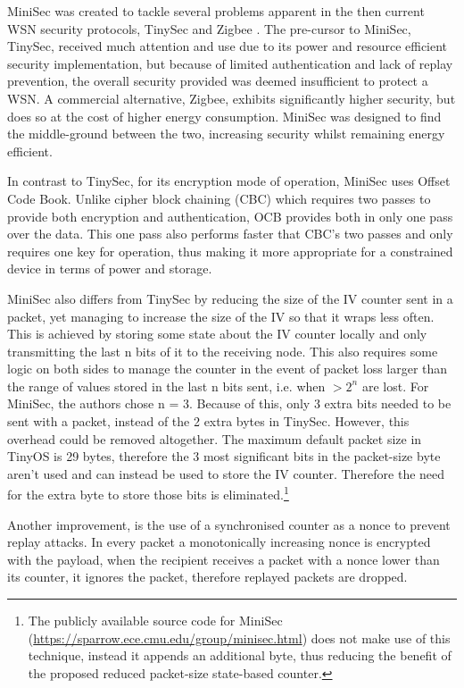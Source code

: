 MiniSec was created to tackle several problems apparent in the then current WSN security protocols, TinySec and Zigbee \cite{MiniSec}. The pre-cursor to MiniSec, TinySec, received much attention and use due to its power and resource efficient security implementation, but because of limited authentication and lack of replay prevention, the overall security provided was deemed insufficient to protect a WSN. A commercial alternative, Zigbee, exhibits significantly higher security, but does so at the cost of higher energy consumption. MiniSec was designed to find the middle-ground between the two, increasing security whilst remaining energy efficient. 

In contrast to TinySec, for its encryption mode of operation, MiniSec uses Offset Code Book. Unlike cipher block chaining (CBC) which requires two passes to provide both encryption and authentication, OCB provides both in only one pass over the data. This one pass also performs faster that CBC's two passes and only requires one key for operation, thus making it more appropriate for a constrained device in terms of power and storage. 

MiniSec also differs from TinySec by reducing the size of the IV counter sent in a packet, yet managing to increase the size of the IV so that it wraps less often. This is achieved by storing some state about the IV counter locally and only transmitting the last n bits of it to the receiving node. This also requires some logic on both sides to manage the counter in the event of packet loss larger than the range of values stored in the last n bits sent, i.e. when $>2^n$ are lost. For MiniSec, the authors chose n = 3. Because of this, only 3 extra bits needed to be sent with a packet, instead of the 2 extra bytes in TinySec. However, this overhead could be removed altogether. The maximum default packet size in TinyOS is 29 bytes, therefore the 3 most significant bits in the packet-size byte aren't used and can instead be used to store the IV counter. Therefore the need for the extra byte to store those bits is eliminated.\footnote{The publicly available source code for MiniSec (\url{https://sparrow.ece.cmu.edu/group/minisec.html}) does not make use of this technique, instead it appends an additional byte, thus reducing the benefit of the proposed reduced packet-size state-based counter.}

Another improvement, is the use of a synchronised counter as a nonce to prevent replay attacks. In every packet a monotonically increasing nonce is encrypted with the payload, when the recipient receives a packet with a nonce lower than its counter, it ignores the packet, therefore replayed packets are dropped. 
